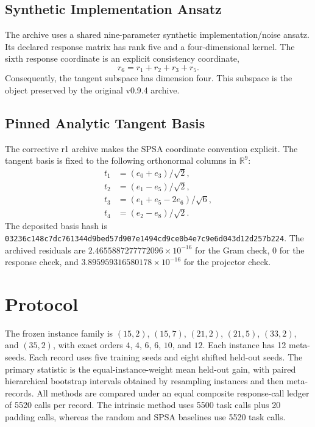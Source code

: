 \documentclass[11pt]{article}
\begin{document}
\subsection{Synthetic Implementation Ansatz}

The archive uses a shared nine-parameter synthetic implementation/noise
ansatz.  Its declared response matrix has rank five and a four-dimensional
kernel.  The sixth response coordinate is an explicit consistency coordinate,
\begin{equation}
r_6 = r_1 + r_2 + r_3 + r_5 .
\end{equation}
Consequently, the tangent subspace has dimension four.  This subspace is the
object preserved by the original v0.9.4 archive.

\subsection{Pinned Analytic Tangent Basis}

The corrective r1 archive makes the SPSA coordinate convention explicit.  The
tangent basis is fixed to the following orthonormal columns in
$\mathbb{R}^9$:
\begin{align}
t_1 &= (e_0+e_3)/\sqrt{2},\\
t_2 &= (e_1-e_5)/\sqrt{2},\\
t_3 &= (e_1+e_5-2e_6)/\sqrt{6},\\
t_4 &= (e_2-e_8)/\sqrt{2}.
\end{align}
The deposited basis hash is
\nolinkurl{03236c148c7dc761344d9bed57d907e1494cd9ce0b4e7c9e6d043d12d257b224}.
The archived residuals are $2.4655887277772096\times10^{-16}$ for the Gram
check, $0$ for the response check, and
$3.895959316580178\times10^{-16}$ for the projector check.

\section{Protocol}

The frozen instance family is
$(15,2)$, $(15,7)$, $(21,2)$, $(21,5)$, $(33,2)$, and $(35,2)$, with exact
orders $4$, $4$, $6$, $6$, $10$, and $12$.  Each instance has 12 meta-seeds.
Each record uses five training seeds and eight shifted held-out seeds.  The
primary statistic is the equal-instance-weight mean held-out gain, with paired
hierarchical bootstrap intervals obtained by resampling instances and then
meta-records.  All methods are compared under an equal composite response-call
ledger of 5520 calls per record.  The intrinsic method uses 5500 task calls
plus 20 padding calls, whereas the random and SPSA baselines use 5520 task
calls.
\end{document}
